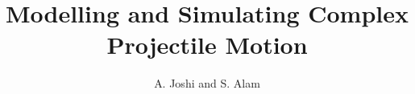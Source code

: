 \documentclass[a4paper,11pt]{article}
\title{\textbf{Modelling and Simulating Complex Projectile Motion}}
\author{A. Joshi and S. Alam}
\date{}
\begin{document}
\maketitle

\begin{abstract}
\end{abstract}

\begin{multicols}{2}


\twocolumn





\newpage

\printbibliography


\end{multicols}
\end{document}
